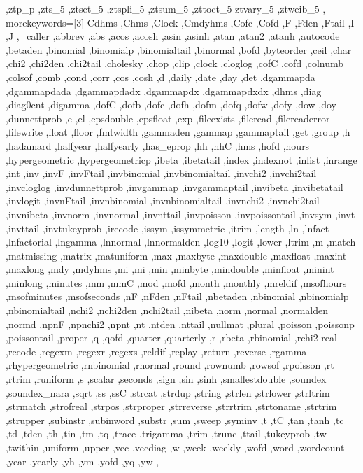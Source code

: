 {{    ,ztp_p ,zts_5 ,ztset_5 ,ztspli_5 ,ztsum_5 ,zttoct_5 ztvary_5
    ,ztweib_5
  },
  morekeywords=[3]{
    Cdhms ,Chms ,Clock ,Cmdyhms ,Cofc ,Cofd ,F ,Fden ,Ftail ,I ,J
    ,_caller ,abbrev ,abs ,acos ,acosh ,asin ,asinh ,atan ,atan2
    ,atanh ,autocode ,betaden ,binomial ,binomialp ,binomialtail
    ,binormal ,bofd ,byteorder ,ceil ,char ,chi2 ,chi2den ,chi2tail
    ,cholesky ,chop ,clip ,clock ,cloglog ,cofC ,cofd ,colnumb ,colsof
    ,comb ,cond ,corr ,cos ,cosh ,d ,daily ,date ,day ,det ,dgammapda
    ,dgammapdada ,dgammapdadx ,dgammapdx ,dgammapdxdx ,dhms ,diag
    ,diag0cnt ,digamma ,dofC ,dofb ,dofc ,dofh ,dofm ,dofq ,dofw ,dofy
    ,dow ,doy ,dunnettprob ,e ,el ,epsdouble ,epsfloat ,exp ,fileexists
    ,fileread ,filereaderror ,filewrite ,float ,floor ,fmtwidth
    ,gammaden ,gammap ,gammaptail ,get ,group ,h ,hadamard ,halfyear
    ,halfyearly ,has_eprop ,hh ,hhC ,hms ,hofd ,hours ,hypergeometric
    ,hypergeometricp ,ibeta ,ibetatail ,index ,indexnot ,inlist
    ,inrange ,int ,inv ,invF ,invFtail ,invbinomial ,invbinomialtail
    ,invchi2 ,invchi2tail ,invcloglog ,invdunnettprob ,invgammap
    ,invgammaptail ,invibeta ,invibetatail ,invlogit ,invnFtail
    ,invnbinomial ,invnbinomialtail ,invnchi2 ,invnchi2tail ,invnibeta
    ,invnorm ,invnormal ,invnttail ,invpoisson ,invpoissontail ,invsym
    ,invt ,invttail ,invtukeyprob ,irecode ,issym ,issymmetric ,itrim
    ,length ,ln ,lnfact ,lnfactorial ,lngamma ,lnnormal ,lnnormalden
    ,log10 ,logit ,lower ,ltrim ,m ,match ,matmissing ,matrix
    ,matuniform ,max ,maxbyte ,maxdouble ,maxfloat ,maxint ,maxlong ,mdy
    ,mdyhms ,mi ,mi ,min ,minbyte ,mindouble ,minfloat ,minint ,minlong
    ,minutes ,mm ,mmC ,mod ,mofd ,month ,monthly ,mreldif
    ,msofhours ,msofminutes ,msofseconds ,nF ,nFden ,nFtail ,nbetaden
    ,nbinomial ,nbinomialp ,nbinomialtail ,nchi2 ,nchi2den ,nchi2tail
    ,nibeta ,norm ,normal ,normalden ,normd ,npnF ,npnchi2 ,npnt ,nt
    ,ntden ,nttail ,nullmat ,plural ,poisson ,poissonp ,poissontail
    ,proper ,q ,qofd ,quarter ,quarterly ,r ,rbeta ,rbinomial ,rchi2
    real ,recode ,regexm ,regexr ,regexs ,reldif ,replay ,return
    ,reverse ,rgamma ,rhypergeometric ,rnbinomial ,rnormal ,round
    ,rownumb ,rowsof ,rpoisson ,rt ,rtrim ,runiform ,s ,scalar ,seconds
    ,sign ,sin ,sinh ,smallestdouble ,soundex ,soundex_nara ,sqrt ,ss
    ,ssC ,strcat ,strdup ,string ,strlen ,strlower ,strltrim ,strmatch
    ,strofreal ,strpos ,strproper ,strreverse ,strrtrim ,strtoname
    ,strtrim ,strupper ,subinstr ,subinword ,substr ,sum ,sweep ,syminv
    ,t ,tC ,tan ,tanh ,tc ,td ,tden ,th ,tin ,tm ,tq ,trace ,trigamma
    ,trim ,trunc ,ttail ,tukeyprob ,tw ,twithin ,uniform ,upper ,vec
    ,vecdiag ,w ,week ,weekly ,wofd ,word ,wordcount ,year ,yearly
    ,yh ,ym ,yofd ,yq ,yw
  },
}


\providecommand{\textcolordummy}[2]{#2}




